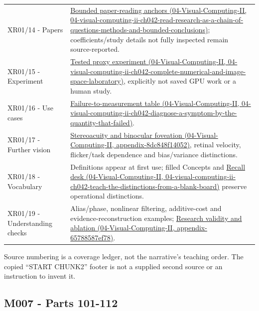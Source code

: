 {\begin{longtable}[]{@{}
  >{\raggedright\arraybackslash}p{}
  >{\raggedright\arraybackslash}p{}@{}}
XR01/14 - Papers & \href{../04-Visual-Computing-II/main.pdf\#nameddest=04-visual-computing-ii-ch042-read-research-as-a-chain-of-questions-methods-and-bounded-conclusions}{Bounded paper-reading anchors (04-Visual-Computing-II, 04-visual-computing-ii-ch042-read-research-as-a-chain-of-questions-methods-and-bounded-conclusions)}; coefficients/study details not fully inspected remain source-reported. \\
XR01/15 - Experiment & \href{../04-Visual-Computing-II/main.pdf\#nameddest=04-visual-computing-ii-ch042-complete-numerical-and-image-space-laboratory}{Tested proxy experiment (04-Visual-Computing-II, 04-visual-computing-ii-ch042-complete-numerical-and-image-space-laboratory)}, explicitly not saved GPU work or a human study. \\
XR01/16 - Use cases & \href{../04-Visual-Computing-II/main.pdf\#nameddest=04-visual-computing-ii-ch042-diagnose-a-symptom-by-the-quantity-that-failed}{Failure-to-measurement table (04-Visual-Computing-II, 04-visual-computing-ii-ch042-diagnose-a-symptom-by-the-quantity-that-failed)}. \\
XR01/17 - Further vision & \href{../04-Visual-Computing-II/main.pdf\#nameddest=appendix-8dc848f14052}{Stereoacuity and binocular foveation (04-Visual-Computing-II, appendix-8dc848f14052)}, retinal velocity, flicker/task dependence and bias/variance distinctions. \\
XR01/18 - Vocabulary & Definitions appear at first use; filled Concepts and \href{../04-Visual-Computing-II/main.pdf\#nameddest=04-visual-computing-ii-ch042-teach-the-distinctions-from-a-blank-board}{Recall desk (04-Visual-Computing-II, 04-visual-computing-ii-ch042-teach-the-distinctions-from-a-blank-board)} preserve operational distinctions. \\
XR01/19 - Understanding checks & Alias/phase, nonlinear filtering, additive-cost and evidence-reconstruction examples; \href{../04-Visual-Computing-II/main.pdf\#nameddest=appendix-65788587ef78}{Research validity and ablation (04-Visual-Computing-II, appendix-65788587ef78)}. \\
\end{longtable}
}

Source numbering is a coverage ledger, not the narrative's teaching order. The copied ``START CHUNK2'' footer is not a supplied second source or an instruction to invent it.

\subsection{M007 - Parts 101-112}\label{appendix-fd090d982a15-m007---parts-101-112}

